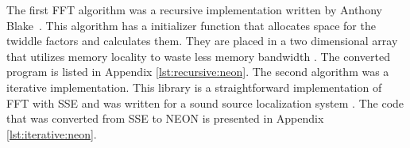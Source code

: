 The first FFT algorithm was a recursive implementation written by Anthony Blake~\cite{neon:recursive}. This algorithm has a initializer function that allocates space for the twiddle factors and calculates them. They are placed in a two dimensional array that utilizes memory locality to waste less memory bandwidth \cite{neon:recursive:details}. The converted program is listed in Appendix \ref{lst:recursive:neon}. The second algorithm was a iterative implementation. This library is a straightforward implementation of FFT with SSE \cite{code:manyears} and was written for a sound source localization system \cite{manyears:site}. The code that was converted from SSE to NEON is presented in Appendix \ref{lst:iterative:neon}.
